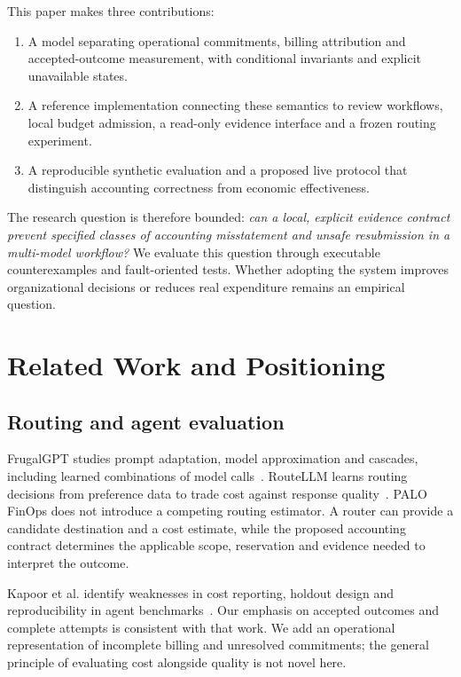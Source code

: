 \documentclass[10pt,twocolumn]{article}
\begin{document}
This paper makes three contributions:
\begin{enumerate}
\item A model separating operational commitments, billing attribution and accepted-outcome measurement, with conditional invariants and explicit unavailable states.
\item A reference implementation connecting these semantics to review workflows, local budget admission, a read-only evidence interface and a frozen routing experiment.
\item A reproducible synthetic evaluation and a proposed live protocol that distinguish accounting correctness from economic effectiveness.
\end{enumerate}

The research question is therefore bounded: \emph{can a local, explicit evidence contract prevent specified classes of accounting misstatement and unsafe resubmission in a multi-model workflow?} We evaluate this question through executable counterexamples and fault-oriented tests. Whether adopting the system improves organizational decisions or reduces real expenditure remains an empirical question.

\section{Related Work and Positioning}
\label{sec:related}

\subsection{Routing and agent evaluation}

FrugalGPT studies prompt adaptation, model approximation and cascades, including learned combinations of model calls~\cite{frugalgpt}. RouteLLM learns routing decisions from preference data to trade cost against response quality~\cite{routellm}. PALO FinOps does not introduce a competing routing estimator. A router can provide a candidate destination and a cost estimate, while the proposed accounting contract determines the applicable scope, reservation and evidence needed to interpret the outcome.

Kapoor et al. identify weaknesses in cost reporting, holdout design and reproducibility in agent benchmarks~\cite{agentsmatter}. Our emphasis on accepted outcomes and complete attempts is consistent with that work. We add an operational representation of incomplete billing and unresolved commitments; the general principle of evaluating cost alongside quality is not novel here.
\end{document}
